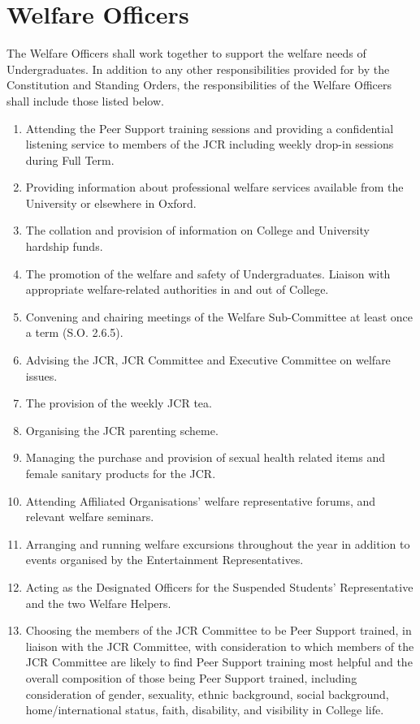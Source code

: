 \section{Welfare Officers}
\npara The Welfare Officers shall work together to support the welfare needs of Undergraduates.
\npara \label{resp:welfare-officers} In addition to any other responsibilities provided for by the Constitution and Standing Orders, the responsibilities of the Welfare Officers shall include those listed below.
\begin{enumerate}
	\item Attending the Peer Support training sessions and providing a confidential listening service to members of the JCR including weekly drop-in sessions during Full Term.     
	\item Providing information about professional welfare services available from the University or elsewhere in Oxford.     
	\item The collation and provision of information on College and University hardship funds.     
	\item The promotion of the welfare and safety of Undergraduates.     
	Liaison with appropriate welfare-related authorities in and out of College.     
	\item Convening and chairing meetings of the Welfare Sub-Committee at least once a term (S.O. 2.6.5).     
	\item Advising the JCR, JCR Committee and Executive Committee on welfare issues.     
	\item The provision of the weekly JCR tea.     
	\item Organising the JCR parenting scheme.
	\item Managing the purchase and provision of sexual health related items and female sanitary products for the JCR.
	\item Attending Affiliated Organisations' welfare representative forums, and relevant welfare seminars.
	\item Arranging and running welfare excursions throughout the year in addition to events organised by the Entertainment Representatives.
	\item Acting as the Designated Officers for the Suspended Students’ Representative and the two Welfare Helpers.
	\item \label{SC:peer-choice} Choosing the members of the JCR Committee to be Peer Support trained, in liaison with the JCR Committee, with consideration to which members of the JCR Committee are likely to find Peer Support training most helpful and the overall composition of those being Peer Support trained, including consideration of gender, sexuality, ethnic background, social background,  home/international status, faith, disability, and visibility in College life.
\end{enumerate}
